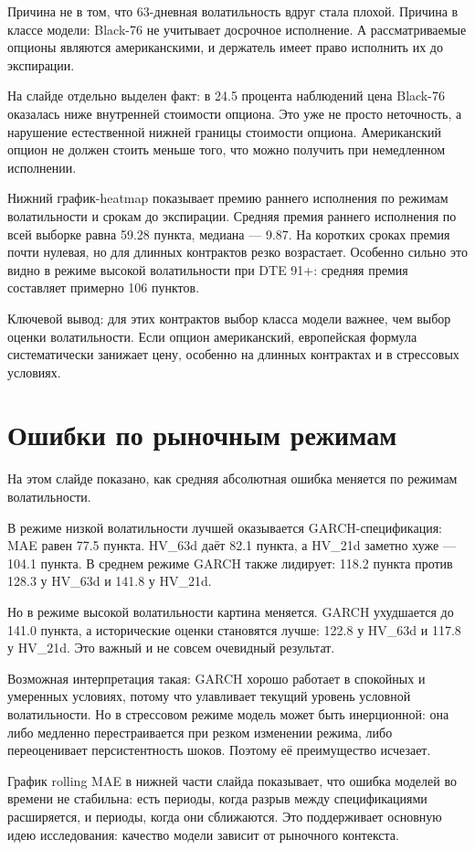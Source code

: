 \documentclass[11pt,a4paper]{article}
\newcommand{\slidetitle}[1]{\section{#1}}
\begin{document}
Причина не в том, что 63-дневная волатильность вдруг стала плохой. Причина в классе модели: Black-76 не учитывает досрочное исполнение. А рассматриваемые опционы являются американскими, и держатель имеет право исполнить их до экспирации.

На слайде отдельно выделен факт: в 24.5 процента наблюдений цена Black-76 оказалась ниже внутренней стоимости опциона. Это уже не просто неточность, а нарушение естественной нижней границы стоимости опциона. Американский опцион не должен стоить меньше того, что можно получить при немедленном исполнении.

Нижний график-heatmap показывает премию раннего исполнения по режимам волатильности и срокам до экспирации. Средняя премия раннего исполнения по всей выборке равна 59.28 пункта, медиана --- 9.87. На коротких сроках премия почти нулевая, но для длинных контрактов резко возрастает. Особенно сильно это видно в режиме высокой волатильности при DTE 91+: средняя премия составляет примерно 106 пунктов.

Ключевой вывод: для этих контрактов выбор класса модели важнее, чем выбор оценки волатильности. Если опцион американский, европейская формула систематически занижает цену, особенно на длинных контрактах и в стрессовых условиях.

\slidetitle{Ошибки по рыночным режимам}

На этом слайде показано, как средняя абсолютная ошибка меняется по режимам волатильности.

В режиме низкой волатильности лучшей оказывается GARCH-спецификация: MAE равен 77.5 пункта. HV\_63d даёт 82.1 пункта, а HV\_21d заметно хуже --- 104.1 пункта. В среднем режиме GARCH также лидирует: 118.2 пункта против 128.3 у HV\_63d и 141.8 у HV\_21d.

Но в режиме высокой волатильности картина меняется. GARCH ухудшается до 141.0 пункта, а исторические оценки становятся лучше: 122.8 у HV\_63d и 117.8 у HV\_21d. Это важный и не совсем очевидный результат.

Возможная интерпретация такая: GARCH хорошо работает в спокойных и умеренных условиях, потому что улавливает текущий уровень условной волатильности. Но в стрессовом режиме модель может быть инерционной: она либо медленно перестраивается при резком изменении режима, либо переоценивает персистентность шоков. Поэтому её преимущество исчезает.

График rolling MAE в нижней части слайда показывает, что ошибка моделей во времени не стабильна: есть периоды, когда разрыв между спецификациями расширяется, и периоды, когда они сближаются. Это поддерживает основную идею исследования: качество модели зависит от рыночного контекста.
\end{document}
